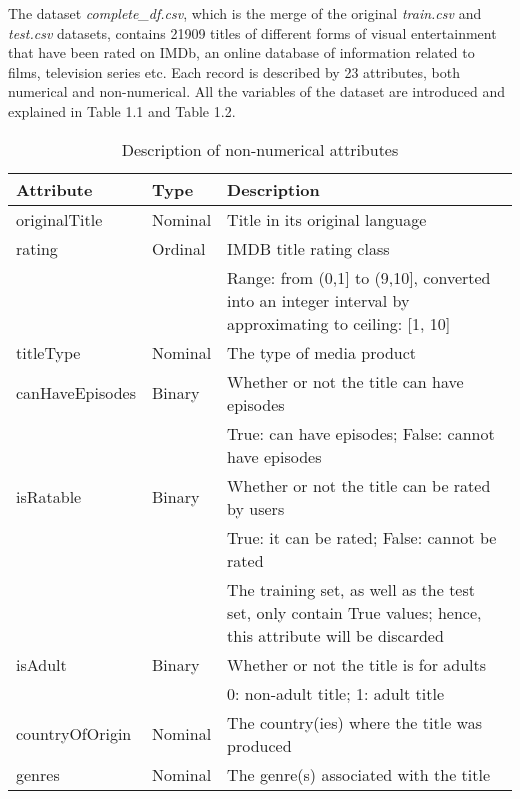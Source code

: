 % 


The dataset \textit{complete\_df.csv}, which is the merge of the original \textit{train.csv} and \textit{test.csv} datasets, contains 21909 titles of different forms of visual entertainment that have been rated on IMDb, an online database of information related to films, television series etc. 
Each record is described by 23 attributes, both numerical and non-numerical. 
All the variables of the dataset are introduced and explained in Table 1.1 and Table 1.2.
\begin{table}[h!]
    \centering
    \begin{tabularx}{\textwidth}{|l|l|X|} %
        \hline
        \textbf{Attribute} & \textbf{Type} & \textbf{Description} \\ 
        \hline
        originalTitle & Nominal & Title in its original language \\  
        \hline
        rating & Ordinal & IMDB title rating class \\
        & & Range: from (0,1] to (9,10], converted into an integer interval by approximating to ceiling: [1, 10]\\ 
        \hline
        titleType & Nominal & The type of media product \\ 
        \hline
        canHaveEpisodes & Binary & Whether or not the title can have episodes \\ 
        & & True: can have episodes; False: cannot have episodes \\ 
        \hline
        isRatable & Binary & Whether or not the title can be rated by users \\ 
        & & True: it can be rated; False: cannot be rated \\
        & & The training set, as well as the test set, only contain True values; hence, this attribute will be discarded \\
        \hline
        isAdult & Binary & Whether or not the title is for adults \\ 
        & & 0: non-adult title; 1: adult title \\ 
        \hline
        countryOfOrigin & Nominal & The country(ies) where the title was produced \\ 
        \hline
        genres & Nominal & The genre(s) associated with the title \\ 
        \hline
    \end{tabularx}
    \caption{Description of non-numerical attributes}
    \label{tab:attributes}
\end{table}


